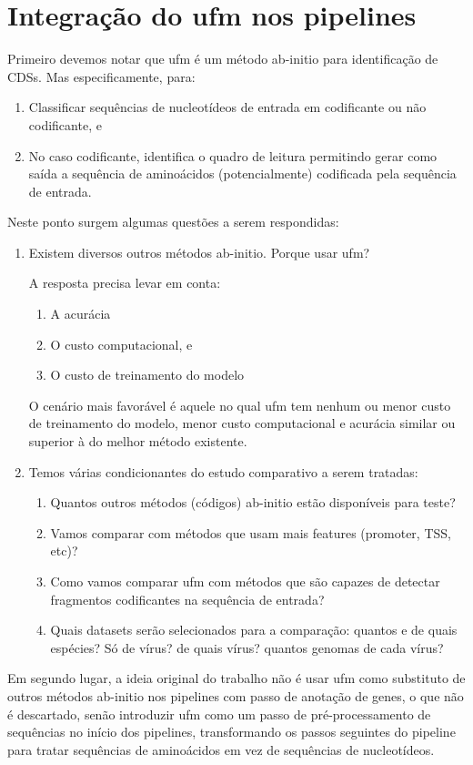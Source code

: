 \documentclass[12pt]{article}
\begin{document}
\section{Integração do \gls{ufm} nos pipelines}

Primeiro devemos notar que \gls{ufm} é um método ab-initio para identificação de CDSs. Mas especificamente, para:
\begin{enumerate}
    \item Classificar sequências de nucleotídeos de entrada em codificante ou não codificante, e
    \item No caso codificante, identifica o quadro de leitura permitindo gerar como saída a sequência de aminoácidos (potencialmente) codificada pela sequência de entrada.
\end{enumerate}
Neste ponto surgem algumas questões a serem respondidas:
\begin{enumerate}
    \item Existem diversos outros métodos ab-initio. Porque usar \gls{ufm}?
    
    A resposta precisa levar em conta: 
    \begin{enumerate}
        \item A acurácia
        \item O custo computacional, e 
        \item O custo de treinamento do modelo
    \end{enumerate}
    
    O cenário mais favorável é aquele no qual \gls{ufm} tem nenhum ou menor custo de treinamento do modelo, menor custo computacional e acurácia similar ou superior à do melhor método existente.
    
    \item Temos várias condicionantes do estudo comparativo a serem tratadas:
    
    \begin{enumerate}
        \item  Quantos outros métodos (códigos) ab-initio estão disponíveis para teste? 
    
        \item Vamos comparar com métodos que usam mais features (promoter, TSS, etc)? 
    
        \item Como vamos comparar \gls{ufm} com métodos que são capazes de detectar fragmentos codificantes na sequência de entrada?
    
        \item Quais datasets serão selecionados para a comparação: quantos e de quais espécies? Só de vírus? de quais vírus? quantos genomas de cada vírus?
    \end{enumerate}
  
\end{enumerate}
Em segundo lugar, a ideia original do trabalho não é usar \gls{ufm} como substituto de outros métodos ab-initio nos pipelines com passo de anotação de genes, o que não é descartado, senão introduzir \gls{ufm} como um passo de pré-processamento de sequências no início dos pipelines, transformando os passos seguintes do pipeline para tratar sequências de aminoácidos em vez de sequências de nucleotídeos. 
\end{document}
